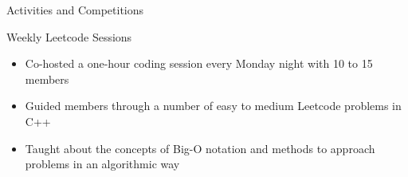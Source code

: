 \documentclass{article}
\newlength{\tabin}
\newlength{\secsep}
\newcommand{\lineunder}{\vspace*{-8pt} \\ \hspace*{-6pt} \hrulefill \\ \vspace*{-15pt}}
\newenvironment{tabbedsection}[1]{
  \begin{list}{}{
      \setlength{\itemsep}{0pt}
      \setlength{\labelsep}{0pt}
      \setlength{\labelwidth}{0pt}
      \setlength{\leftmargin}{\tabin}
      \setlength{\rightmargin}{\tabin}
      \setlength{\listparindent}{0pt}
      \setlength{\parsep}{0pt}
      \setlength{\parskip}{0pt}
      \setlength{\partopsep}{0pt}
      \setlength{\topsep}{#1}
    }
  \item[]
}{\end{list}}
\newenvironment{resume_section}[1]{
  \filbreak
  \vspace{2\secsep}
  \textsc{\large#1}
  \lineunder
  \begin{tabbedsection}{\secsep}
}{\end{tabbedsection}}
\newenvironment{resume_subsection}[2][]{
  \textbf{#2} \hfill {\footnotesize #1} \hspace{2em}
  \begin{tabbedsection}{0.5\secsep}
}{\end{tabbedsection}}
\newenvironment{subitems}{
  \renewcommand{\labelitemi}{-}
  \begin{itemize}
      \setlength{\labelsep}{1em}
}{\end{itemize}}
\begin{document}
\begin{resume_section}{Activities and Competitions}



  \begin{resume_subsection}{{Weekly Leetcode Sessions}}
    \begin{subitems}
      \item Co-hosted a one-hour coding session every Monday night with 10 to 15 members
      \item Guided members through a number of easy to medium Leetcode problems in C++
      \item Taught about the concepts of Big-O notation and methods to approach problems in an algorithmic way
    \end{subitems}
  \end{resume_subsection}


\end{resume_section}
\end{document}
